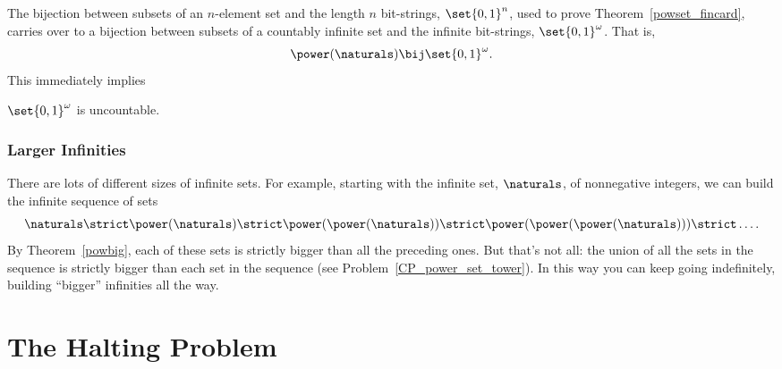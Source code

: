 The bijection between subsets of an $n$-element set and the length $n$
bit-strings, $\set{0,1}^n$, used to prove
Theorem~\ref{powset_fincard}, carries over to a bijection between
subsets of a countably infinite set and the infinite bit-strings,
$\set{0,1}^{\omega}$.  That is,
\[
\power(\naturals) \bij \set{0,1}^{\omega}.
\]
This immediately implies
\begin{corollary}
$\set{0,1}^{\omega}$ is uncountable.
\end{corollary}

\subsubsection{Larger Infinities}

There are lots of different sizes of infinite sets.  For example,
starting with the infinite set, $\naturals$, of nonnegative integers,
we can build the infinite sequence of sets
\[
\naturals \strict \power(\naturals) \strict \power(\power(\naturals))
\strict \power(\power(\power(\naturals))) \strict \dots.
\]
By Theorem~\ref{powbig}, each of these sets is strictly bigger than
all the preceding ones.  But that's not all: the union of all the sets
in the sequence is strictly bigger than each set in the sequence (see
Problem~\ref{CP_power_set_tower}).  In this way you can keep going
indefinitely, building ``bigger'' infinities all the way.


\begin{problems}
\practiceproblems

\classproblems
{}

\homeworkproblems
{}

\examproblems
{}

\end{problems}

\section{The Halting Problem}\label{halting_sec}

